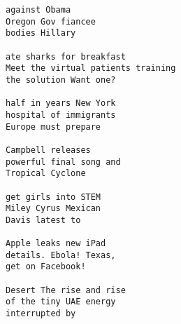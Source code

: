 \documentclass[twocolumn,times]{article}
\begin{document}
\begin{verbatim}
against Obama 
Oregon Gov fiancee 
bodies Hillary 

ate sharks for breakfast 
Meet the virtual patients training 
the solution Want one? 

half in years New York 
hospital of immigrants 
Europe must prepare 

Campbell releases 
powerful final song and 
Tropical Cyclone 

get girls into STEM 
Miley Cyrus Mexican 
Davis latest to 

Apple leaks new iPad 
details. Ebola! Texas, 
get on Facebook! 

Desert The rise and rise 
of the tiny UAE energy 
interrupted by 

\end{verbatim}
\end{document}
